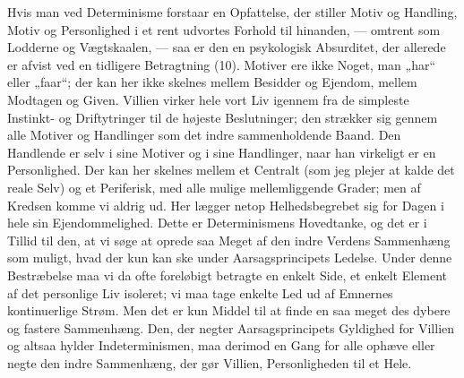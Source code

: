 \documentclass[12pt,a4paper]{book}
\newcommand{\opage}[1]{\marginnote{\footnotesize\textit{[#1]}}}
\begin{document}
Hvis man ved Determinisme forstaar en Opfattelse, der stiller Motiv og Handling,
Motiv og Personlighed i et rent udvortes Forhold til hinanden, --- omtrent som
Lodderne og Vægtskaalen, --- saa er den en psykologisk Absurditet, der allerede er
afvist ved en tidligere Betragtning (10). Motiver ere ikke Noget, man „har“ eller
„faar“; der kan her ikke skelnes mellem Besidder og Ejendom, mellem Modtagen og
Given. Villien virker hele vort Liv igennem fra de simpleste Instinkt- og
Driftytringer til de højeste Beslutninger; den strækker sig gennem alle Motiver og
Handlinger som det indre sammenholdende Baand. Den Handlende er \opage{292} selv i sine Motiver og
i sine Handlinger, naar han virkeligt er en Personlighed. Der kan her skelnes mellem
et Centralt (som jeg plejer at kalde det reale Selv) og et Periferisk, med alle mulige
mellemliggende Grader; men af Kredsen komme vi aldrig ud. Her lægger netop
Helhedsbegrebet sig for Dagen i hele sin Ejendommelighed. Dette er Determinismens
Hovedtanke, og det er i Tillid til den, at vi søge at oprede saa Meget af den indre
Verdens Sammenhæng som muligt, hvad der kun kan ske under Aarsagsprincipets Ledelse. Under
denne Bestræbelse maa vi da ofte foreløbigt betragte en enkelt Side, et enkelt Element
af det personlige Liv isoleret; vi maa tage enkelte Led ud af Emnernes kontinuerlige
Strøm. Men det er kun Middel til at finde en saa meget des dybere og fastere
Sammenhæng. Den, der negter Aarsagsprincipets Gyldighed for Villien og altsaa hylder
Indeterminismen, maa derimod en Gang for alle ophæve eller negte den indre
Sammenhæng, der gør Villien, Personligheden til et Hele.
\end{document}
